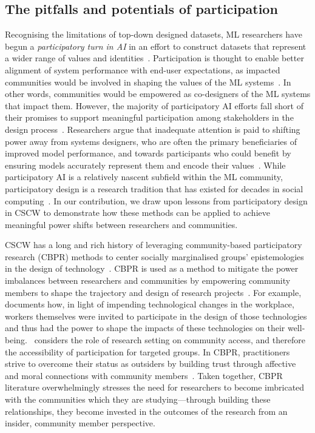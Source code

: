 \subsection{The pitfalls and potentials of participation}
Recognising the limitations of top-down designed datasets, ML researchers have begun a \textit{participatory turn in AI} in an effort to construct datasets that represent a wider range of values and identities~\cite{delgado2023participatory,birhanePowerPeopleOpportunities2022,ParticipationScaleTensions,corbett2023power,suresh2024participation}. Participation is thought to enable better alignment of system performance with end-user expectations, as impacted communities would be involved in shaping the values of the ML systems~\cite{delgado2023participatory}. In other words, communities would be empowered as co-designers of the ML systems that impact them. However, the majority of participatory AI efforts fall short of their promises to support meaningful participation among stakeholders in the design process~\cite{ParticipationScaleTensions}. Researchers argue that inadequate attention is paid to shifting power away from systems designers, who are often the primary beneficiaries of improved model performance, and towards participants who could benefit by ensuring models accurately represent them and encode their values~\cite{birhanePowerPeopleOpportunities2022}. While participatory AI is a relatively nascent subfield within the ML community, participatory design is a research tradition that has existed for decades in social computing~\cite{asaro2000transforming,bodker2022can}. In our contribution, we draw upon lessons from participatory design in CSCW to demonstrate how these methods can be applied to achieve meaningful power shifts between researchers and communities. 

CSCW has a long and rich history of leveraging community-based participatory research (CBPR) methods to center socially marginalised groups' epistemologies in the design of technology~\cite{le2015strangers,sum2023translation,bratteteig2016unpacking,harrington2019deconstructing,bannon2018reimagining,pierre2021getting}. CBPR is used as a method to mitigate the power imbalances between researchers and communities by empowering community members to shape the trajectory and design of research projects~\cite{reasonSAGEHandbookAction2008}. For example,~\citet{asaro2000transforming} documents how, in light of impending technological changes in the workplace, workers themselves were invited to participate in the design of those technologies and thus had the power to shape the impacts of these technologies on their well-being.~\citet{harrington2019deconstructing} considers the role of research setting on community access, and therefore the accessibility of participation for targeted groups. In CBPR, practitioners strive to overcome their status as outsiders by building trust through affective and moral connections with community members~\cite{le2015strangers,mcmillan1986sense}. Taken together, CBPR literature overwhelmingly stresses the need for researchers to become imbricated with the communities which they are studying---through building these relationships, they become invested in the outcomes of the research from an insider, community member perspective. 

